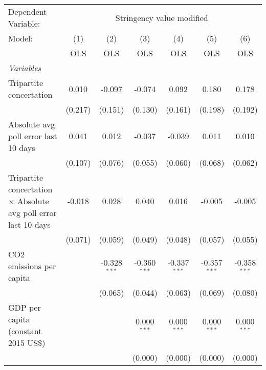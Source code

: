 
\begingroup
\centering
\begin{tabular}{lcccccc}
   \toprule
   Dependent Variable: & \multicolumn{6}{c}{Stringency value modified}\\
   Model:                                                                 & (1)     & (2)            & (3)            & (4)            & (5)            & (6)\\  
                                                                          &  OLS    & OLS            & OLS            & OLS            & OLS            & OLS\\  
   \midrule
   \emph{Variables}\\
   Tripartite concertation                                                & 0.010   & -0.097         & -0.074         & 0.092          & 0.180          & 0.178\\   
                                                                          & (0.217) & (0.151)        & (0.130)        & (0.161)        & (0.198)        & (0.192)\\   
   Absolute avg poll error last 10 days                                   & 0.041   & 0.012          & -0.037         & -0.039         & 0.011          & 0.010\\   
                                                                          & (0.107) & (0.076)        & (0.055)        & (0.060)        & (0.068)        & (0.062)\\   
   Tripartite concertation $\times$ Absolute avg poll error last 10 days  & -0.018  & 0.028          & 0.040          & 0.016          & -0.005         & -0.005\\   
                                                                          & (0.071) & (0.059)        & (0.049)        & (0.048)        & (0.057)        & (0.055)\\   
   CO2 emissions per capita                                               &         & -0.328$^{***}$ & -0.360$^{***}$ & -0.337$^{***}$ & -0.357$^{***}$ & -0.358$^{***}$\\   
                                                                          &         & (0.065)        & (0.044)        & (0.063)        & (0.069)        & (0.080)\\   
   GDP per capita (constant 2015 US\$)                                    &         &                & 0.000$^{***}$  & 0.000$^{***}$  & 0.000$^{***}$  & 0.000$^{***}$\\   
                                                                          &         &                & (0.000)        & (0.000)        & (0.000)        & (0.000)\\   

\end{tabular}
